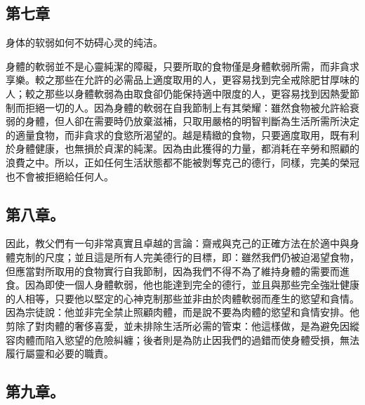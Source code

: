 \subsection{第七章}

身体的软弱如何不妨碍心灵的纯洁。\par

身體的軟弱並不是心靈純潔的障礙，只要所取的食物僅是身體軟弱所需，而非貪求享樂。較之那些在允許的必需品上適度取用的人，更容易找到完全戒除肥甘厚味的人；較之那些以身體軟弱為由取食卻仍能保持適中限度的人，更容易找到因熱愛節制而拒絕一切的人。因為身體的軟弱在自我節制上有其榮耀：雖然食物被允許給衰弱的身體，但人卻在需要時仍放棄滋補，只取用嚴格的明智判斷為生活所需所決定的適量食物，而非貪求的食慾所渴望的。越是精緻的食物，只要適度取用，既有利於身體健康，也無損於貞潔的純潔。因為由此獲得的力量，都消耗在辛勞和照顧的浪費之中。所以，正如任何生活狀態都不能被剝奪克己的德行，同樣，完美的榮冠也不會被拒絕給任何人。\par


\subsection{第八章。}

\par

因此，教父們有一句非常真實且卓越的言論：齋戒與克己的正確方法在於適中與身體克制的尺度；並且這是所有人完美德行的目標，即：雖然我們仍被迫渴望食物，但應當對所取用的食物實行自我節制，因為我們不得不為了維持身體的需要而進食。因為即使一個人身體軟弱，他也能達到完全的德行，並且與那些完全強壯健康的人相等，只要他以堅定的心神克制那些並非由於肉體軟弱而產生的慾望和貪情。因為宗徒說：他並非完全禁止照顧肉體，而是說不要為肉體的慾望和貪情安排。他剪除了對肉體的奢侈喜愛，並未排除生活所必需的管束：他這樣做，是為避免因縱容肉體而陷入慾望的危險糾纏；後者則是為防止因我們的過錯而使身體受損，無法履行屬靈和必要的職責。\par


\subsection{第九章。}

\par

